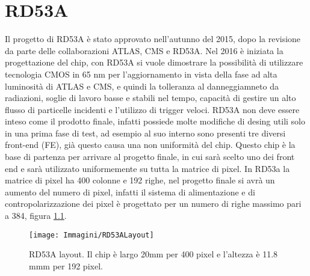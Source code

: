 \chapter{RD53A}

Il progetto di RD53A è stato approvato nell'autunno del 2015, dopo la revisione da parte delle collaborazioni ATLAS, CMS e RD53A. Nel 2016 è iniziata la progettazione del chip, con RD53A si vuole dimostrare la possibilità di utilizzare tecnologia CMOS  in 65 nm per l'aggiornamento in vista della fase ad alta luminosità di ATLAS e CMS, e quindi la tolleranza al danneggiamneto da radiazioni, soglie di lavoro basse e stabili nel tempo, capacità di gestire un alto flusso di particelle incidenti e l'utilizzo di trigger veloci. 
RD53A non deve essere inteso come il prodotto finale, infatti possiede molte modifiche di desing utili solo in una prima fase di test, ad esempio al suo interno sono presenti tre diversi front-end (FE), già questo causa una non uniformità del chip. 
Questo chip è la base di partenza per arrivare al progetto finale, in cui sarà scelto uno dei front end e sarà utilizzato uniformemente su tutta la matrice di pixel. In RD53a la matrice di pixel ha 400 colonne e 192 righe, nel progetto finale si avrà un aumento del numero di pixel, infatti il sistema di alimentazione e di contropolarizzazione dei pixel è progettato per un numero di righe massimo pari a 384, figura \ref{RD53ALayout}.
\begin{figure}
\centering
\texttt{[image: Immagini/RD53ALayout]}
\caption{RD53A layout. Il chip è largo 20mm per 400 pixel e l'altezza è 11.8 mmm per 192 pixel.}
\label{RD53ALayout}
\end{figure}

